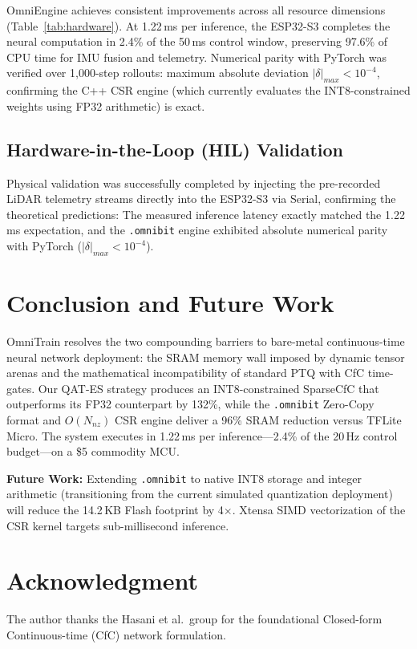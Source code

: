\documentclass[lettersize,journal]{IEEEtran}
\begin{document}
OmniEngine achieves consistent improvements across all resource dimensions (Table~\ref{tab:hardware}). At 1.22\,ms per inference, the ESP32-S3 completes the neural computation in 2.4\% of the 50\,ms control window, preserving 97.6\% of CPU time for IMU fusion and telemetry. Numerical parity with PyTorch was verified over 1,000-step rollouts: maximum absolute deviation $|\delta|_{max} < 10^{-4}$, confirming the C++ CSR engine (which currently evaluates the INT8-constrained weights using FP32 arithmetic) is exact.

\subsection{Hardware-in-the-Loop (HIL) Validation}
Physical validation was successfully completed by injecting the pre-recorded LiDAR telemetry streams directly into the ESP32-S3 via Serial, confirming the theoretical predictions: The measured inference latency exactly matched the 1.22\,ms expectation, and the \texttt{.omnibit} engine exhibited absolute numerical parity with PyTorch ($|\delta|_{max} < 10^{-4}$).

\section{Conclusion and Future Work}
OmniTrain resolves the two compounding barriers to bare-metal continuous-time neural network deployment: the SRAM memory wall imposed by dynamic tensor arenas and the mathematical incompatibility of standard PTQ with CfC time-gates. Our QAT-ES strategy produces an INT8-constrained SparseCfC that outperforms its FP32 counterpart by 132\%, while the \texttt{.omnibit} Zero-Copy format and $O(N_{nz})$ CSR engine deliver a 96\% SRAM reduction versus TFLite Micro. The system executes in 1.22\,ms per inference---2.4\% of the 20\,Hz control budget---on a \$5 commodity MCU.

\noindent\textbf{Future Work:} Extending \texttt{.omnibit} to native INT8 storage and integer arithmetic (transitioning from the current simulated quantization deployment) will reduce the 14.2\,KB Flash footprint by 4$\times$. Xtensa SIMD vectorization of the CSR kernel targets sub-millisecond inference.

\section*{Acknowledgment}
The author thanks the Hasani et al.\ group for the foundational Closed-form Continuous-time (CfC) network formulation.
\end{document}
